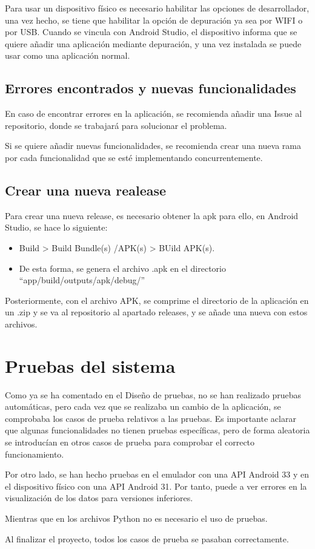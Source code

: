 Para usar un dispositivo físico es necesario habilitar las opciones de desarrollador, una vez hecho, se tiene que habilitar la opción de depuración ya sea por WIFI o por USB. Cuando se vincula con Android Studio, el dispositivo informa que se quiere añadir una aplicación mediante depuración, y una vez instalada se puede  usar como una aplicación normal.
\subsection{Errores encontrados y nuevas funcionalidades}

En caso de encontrar errores en la aplicación, se recomienda añadir una Issue al repositorio, donde se trabajará para solucionar el problema.

Si se quiere añadir nuevas funcionalidades, se recomienda crear una nueva rama por cada funcionalidad que se esté implementando concurrentemente.

\subsection{Crear una nueva realease}

Para crear una nueva release, es necesario obtener la apk para ello, en Android Studio, se hace lo siguiente:
\begin{itemize}
    \item Build > Build Bundle(s) /APK(s) > BUild APK(s).
    \item De esta forma, se genera el archivo .apk en el directorio ``app/build/outputs/apk/debug/''
\end{itemize}

Posteriormente, con el archivo APK, se comprime el directorio de la aplicación en un .zip y se va al repositorio al apartado releases, y se añade una nueva con estos archivos.

\section{Pruebas del sistema}

Como ya se ha comentado en el Diseño de pruebas, no se han realizado pruebas automáticas, pero cada vez que se realizaba un cambio de la aplicación, se comprobaba los casos de prueba relativos a las pruebas. Es importante aclarar que algunas funcionalidades no tienen pruebas específicas, pero de forma aleatoria se introducían en otros casos de prueba para comprobar el correcto funcionamiento.

Por otro lado, se han hecho pruebas en el emulador con una API Android 33 y en el dispositivo físico con una API Android 31. Por tanto, puede a ver errores en la visualización de los datos para versiones inferiores.

Mientras que en los archivos Python no es necesario el uso de pruebas.

Al finalizar el proyecto, todos los casos de prueba se pasaban correctamente.

